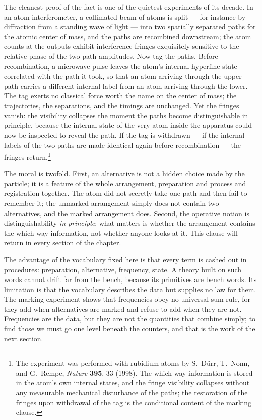 The cleanest proof of the fact is one of the quietest experiments of its decade. In an atom interferometer, a collimated beam of atoms is split --- for instance by diffraction from a standing wave of light --- into two spatially separated paths for the atomic center of mass, and the paths are recombined downstream; the atom counts at the outputs exhibit interference fringes exquisitely sensitive to the relative phase of the two path amplitudes. Now tag the paths. Before recombination, a microwave pulse leaves the atom's internal hyperfine state correlated with the path it took, so that an atom arriving through the upper path carries a different internal label from an atom arriving through the lower. The tag exerts no classical force worth the name on the center of mass; the trajectories, the separations, and the timings are unchanged. Yet the fringes vanish: the visibility collapses the moment the paths become distinguishable in principle, because the internal state of the very atom inside the apparatus could now be inspected to reveal the path. If the tag is withdrawn --- if the internal labels of the two paths are made identical again before recombination --- the fringes return.\footnote{The experiment was performed with rubidium atoms by S.~D\"urr, T.~Nonn, and G.~Rempe, \emph{Nature} \textbf{395}, 33 (1998). The which-way information is stored in the atom's own internal states, and the fringe visibility collapses without any measurable mechanical disturbance of the paths; the restoration of the fringes upon withdrawal of the tag is the conditional content of the marking clause.}

The moral is twofold. First, an alternative is not a hidden choice made by the particle; it is a feature of the whole arrangement, preparation and process and registration together. The atom did not secretly take one path and then fail to remember it; the unmarked arrangement simply does not contain two alternatives, and the marked arrangement does. Second, the operative notion is distinguishability \emph{in principle}: what matters is whether the arrangement contains the which-way information, not whether anyone looks at it. This clause will return in every section of the chapter.

The advantage of the vocabulary fixed here is that every term is cashed out in procedures: preparation, alternative, frequency, state. A theory built on such words cannot drift far from the bench, because its primitives are bench words. Its limitation is that the vocabulary describes the data but supplies no law for them. The marking experiment shows that frequencies obey no universal sum rule, for they add when alternatives are marked and refuse to add when they are not. Frequencies are the data, but they are not the quantities that combine simply; to find those we must go one level beneath the counters, and that is the work of the next section.

